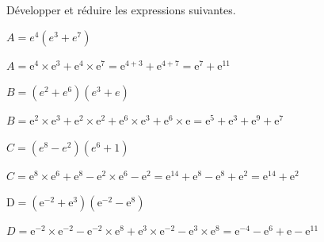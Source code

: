 \documentclass[11pt,a4paper]{article}  %
\begin{document}
Développer et réduire les expressions suivantes.
\begin{enumMet}
	\item $A=e^4\left(e^3+e^7\right)$
	\begin{corrBox}
		$A=\mathrm{e}^4 \times \mathrm{e}^3+\mathrm{e}^4 \times \mathrm{e}^7=\mathrm{e}^{4+3}+\mathrm{e}^{4+7}=\mathrm{e}^7+\mathrm{e}^{11}$		
	\end{corrBox}
	\item $B=\left(e^2+e^6\right)\left(e^3+e\right)$
	\begin{corrBox}
		$B=\mathrm{e}^2 \times \mathrm{e}^3+\mathrm{e}^2 \times \mathrm{e}^2+\mathrm{e}^6 \times \mathrm{e}^3+\mathrm{e}^6 \times \mathrm{e}=\mathrm{e}^5+\mathrm{e}^3+\mathrm{e}^9+\mathrm{e}^7$		
	\end{corrBox}
	\item $C=\left(e^8-e^2\right)\left(e^6+1\right)$
	\begin{corrBox}
		$C=\mathrm{e}^8 \times \mathrm{e}^6+\mathrm{e}^8-\mathrm{e}^2 \times \mathrm{e}^6-\mathrm{e}^2=\mathrm{e}^{14}+\mathrm{e}^8-\mathrm{e}^8+\mathrm{e}^2=\mathrm{e}^{14}+\mathrm{e}^2$		
	\end{corrBox}
	\item $\mathrm{D}=\left(\mathrm{e}^{-2}+\mathrm{e}^3\right)\left(\mathrm{e}^{-2}-\mathrm{e}^8\right)$
	\begin{corrBox}
		$D=\mathrm{e}^{-2} \times \mathrm{e}^{-2}-\mathrm{e}^{-2} \times \mathrm{e}^8+\mathrm{e}^3 \times \mathrm{e}^{-2}-\mathrm{e}^3 \times \mathrm{e}^8=\mathrm{e}^{-4}-\mathrm{e}^6+\mathrm{e}-\mathrm{e}^{11}$		
	\end{corrBox}
\end{enumMet}


\end{document}
